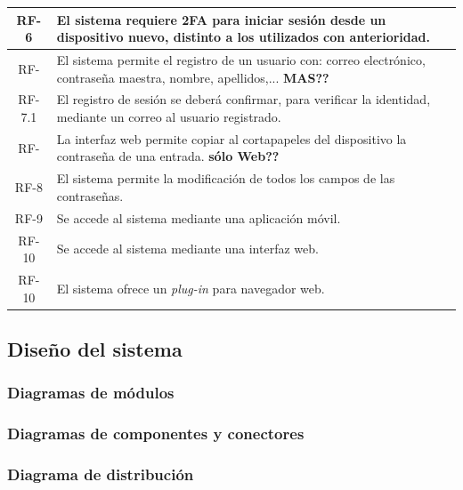 \documentclass{article}
\begin{document}
\begin{table}[H]
\begin{tabular}{| c | p{30em} |}
        RF-6 & El sistema requiere 2FA para iniciar sesión desde un dispositivo nuevo, distinto a los utilizados con anterioridad. \\ \hline
        RF- & El sistema permite el registro de un usuario con: correo electrónico, contraseña maestra, nombre, apellidos,... \textbf{MAS??}\\ \hline %
        RF-7.1 & El registro de sesión se deberá confirmar, para verificar la identidad, mediante un correo al usuario registrado. \\ \hline
        RF- & La interfaz web permite copiar al cortapapeles del dispositivo la contraseña de una entrada. \textbf{sólo Web??}\\ \hline %
        RF-8 & El sistema permite la modificación de todos los campos de las contraseñas. \\ \hline
        RF-9 & Se accede al sistema mediante una aplicación móvil. \\ \hline
        RF-10 & Se accede al sistema mediante una interfaz web. \\ \hline
        RF-10 & El sistema ofrece un \textit{plug-in} para navegador web. \\ \hline
    \end{tabular}
\end{table}

\subsection{Diseño del sistema}

\subsubsection*{Diagramas de módulos}



\subsubsection*{Diagramas de componentes y conectores}



\subsubsection*{Diagrama de distribución}
\end{document}
